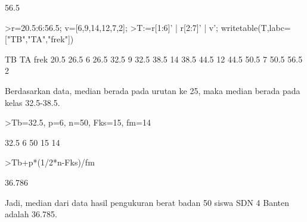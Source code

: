 \documentclass[12pt,arial,letterpaper]{book}
\begin{document}
\begin{eulercomment}
\begin{eulercomment}
\begin{eulercomment}
\begin{eulercomment}
\begin{eulercomment}
\begin{eulercomment}
\begin{eulercomment}
\begin{eulercomment}
\begin{eulercomment}
\begin{eulercomment}
\begin{eulercomment}
\begin{eulercomment}
\begin{eulercomment}
\begin{eulercomment}
\begin{eulercomment}
\begin{eulercomment}
\begin{eulercomment}
\begin{eulercomment}
\begin{eulercomment}
\begin{eulercomment}
\begin{eulercomment}
\begin{eulercomment}
\begin{eulercomment}
\begin{eulercomment}
\begin{eulercomment}
\begin{eulercomment}
\begin{eulercomment}
\begin{eulercomment}
\begin{eulercomment}
\begin{eulercomment}
\begin{eulercomment}
\begin{eulercomment}
\begin{eulercomment}
\begin{eulercomment}
\begin{eulercomment}
\begin{eulercomment}
\begin{eulercomment}
\begin{eulercomment}
\begin{euleroutput}
  56.5
\end{euleroutput}
\begin{eulerprompt}
>r=20.5:6:56.5; v=[6,9,14,12,7,2];
>T:=r[1:6]' | r[2:7]' | v'; writetable(T,labc=["TB","TA","frek"])
\end{eulerprompt}
\begin{euleroutput}
          TB        TA      frek
        20.5      26.5         6
        26.5      32.5         9
        32.5      38.5        14
        38.5      44.5        12
        44.5      50.5         7
        50.5      56.5         2
\end{euleroutput}
\begin{eulercomment}
Berdasarkan data, median berada pada urutan ke 25, maka median berada
pada kelas 32.5-38.5.
\end{eulercomment}
\begin{eulerprompt}
>Tb=32.5, p=6, n=50, Fks=15, fm=14
\end{eulerprompt}
\begin{euleroutput}
  32.5
  6
  50
  15
  14
\end{euleroutput}
\begin{eulerprompt}
>Tb+p*(1/2*n-Fks)/fm
\end{eulerprompt}
\begin{euleroutput}
  36.786
\end{euleroutput}
\begin{eulercomment}
Jadi, median dari data hasil pengukuran berat badan 50 siswa SDN 4
Banten adalah 36.785.


\end{eulercomment}
\end{eulercomment}
\end{eulercomment}
\end{eulercomment}
\end{eulercomment}
\end{eulercomment}
\end{eulercomment}
\end{eulercomment}
\end{eulercomment}
\end{eulercomment}
\end{eulercomment}
\end{eulercomment}
\end{eulercomment}
\end{eulercomment}
\end{eulercomment}
\end{eulercomment}
\end{eulercomment}
\end{eulercomment}
\end{eulercomment}
\end{eulercomment}
\end{eulercomment}
\end{eulercomment}
\end{eulercomment}
\end{eulercomment}
\end{eulercomment}
\end{eulercomment}
\end{eulercomment}
\end{eulercomment}
\end{eulercomment}
\end{eulercomment}
\end{eulercomment}
\end{eulercomment}
\end{eulercomment}
\end{eulercomment}
\end{eulercomment}
\end{eulercomment}
\end{eulercomment}
\end{eulercomment}
\end{eulercomment}
\end{document}
